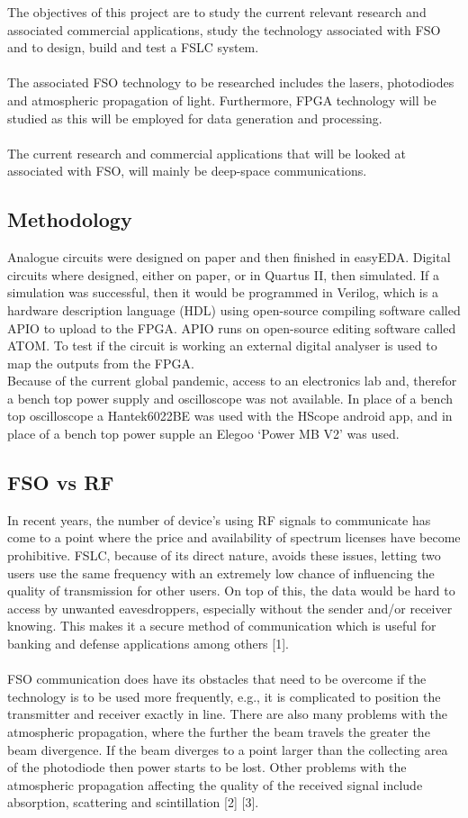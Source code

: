 \documentclass[conference]{IEEEtran}
\begin{document}
The objectives of this project are to study the current relevant research and associated commercial applications, study the technology associated with FSO and to design, build and test a FSLC system.
\\\\
The associated FSO technology to be researched includes the lasers, photodiodes and atmospheric propagation of light. Furthermore, FPGA technology will be studied as this will be employed for data generation and processing.\\\\
The current research and commercial applications that will be looked at associated with FSO, will mainly be deep-space communications.

\subsection{Methodology}
Analogue circuits were designed on paper and then finished in easyEDA. Digital circuits where designed, either on paper, or in Quartus II, then simulated. If a simulation was successful, then it would be programmed in Verilog, which is a hardware description language (HDL) using open-source compiling software called APIO to upload to the FPGA. APIO runs on open-source editing software called ATOM. To test if the circuit is working an external digital analyser is used to map the outputs from the FPGA.\\
Because of the current global pandemic, access to an electronics lab and, therefor a bench top power supply and oscilloscope was not available. In place of a bench top oscilloscope a Hantek6022BE was used with the HScope android app, and in place of a bench top power supple an Elegoo ‘Power MB V2’ was used.

\subsection{FSO vs RF}
In recent years, the number of device’s using RF signals to communicate has come to a point where the price and availability of spectrum licenses have become prohibitive. FSLC, because of its direct nature, avoids these issues, letting two users use the same frequency with an extremely low chance of influencing the quality of transmission for other users. On top of this, the data would be hard to access by unwanted eavesdroppers, especially without the sender and/or receiver knowing. This makes it a secure method of communication which is useful for banking and defense applications among others [1]. 
\\\\
FSO communication does have its obstacles that need to be overcome if the technology is to be used more frequently, e.g., it is complicated to position the transmitter and receiver exactly in line. There are also many problems with the atmospheric propagation, where the further the beam travels the greater the beam divergence. If the beam diverges to a point larger than the collecting area of the photodiode then power starts to be lost. Other problems with the atmospheric propagation affecting the quality of the received signal include absorption, scattering and scintillation [2] [3].
\end{document}
